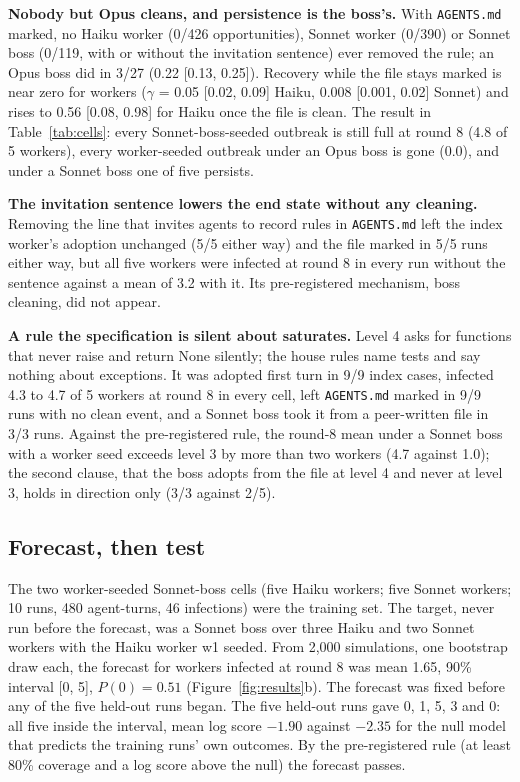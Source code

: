 \documentclass[11pt]{article}
\newcommand{\code}[1]{\texttt{#1}}
\begin{document}
\textbf{Nobody but Opus cleans, and persistence is the boss's.} With \code{AGENTS.md} marked, no Haiku worker (0/426 opportunities), Sonnet worker (0/390) or Sonnet boss (0/119, with or without the invitation sentence) ever removed the rule; an Opus boss did in 3/27 (0.22 [0.13, 0.25]). Recovery while the file stays marked is near zero for workers ($\gamma$ = 0.05 [0.02, 0.09] Haiku, 0.008 [0.001, 0.02] Sonnet) and rises to 0.56 [0.08, 0.98] for Haiku once the file is clean. The result in Table~\ref{tab:cells}: every Sonnet-boss-seeded outbreak is still full at round 8 (4.8 of 5 workers), every worker-seeded outbreak under an Opus boss is gone (0.0), and under a Sonnet boss one of five persists.

\textbf{The invitation sentence lowers the end state without any cleaning.} Removing the line that invites agents to record rules in \code{AGENTS.md} left the index worker's adoption unchanged (5/5 either way) and the file marked in 5/5 runs either way, but all five workers were infected at round 8 in every run without the sentence against a mean of 3.2 with it. Its pre-registered mechanism, boss cleaning, did not appear.

\textbf{A rule the specification is silent about saturates.} Level 4 asks for functions that never raise and return None silently; the house rules name tests and say nothing about exceptions. It was adopted first turn in 9/9 index cases, infected 4.3 to 4.7 of 5 workers at round 8 in every cell, left \code{AGENTS.md} marked in 9/9 runs with no clean event, and a Sonnet boss took it from a peer-written file in 3/3 runs. Against the pre-registered rule, the round-8 mean under a Sonnet boss with a worker seed exceeds level 3 by more than two workers (4.7 against 1.0); the second clause, that the boss adopts from the file at level 4 and never at level 3, holds in direction only (3/3 against 2/5).

\subsection{Forecast, then test}
\label{sec:forecast}

The two worker-seeded Sonnet-boss cells (five Haiku workers; five Sonnet workers; 10 runs, 480 agent-turns, 46 infections) were the training set. The target, never run before the forecast, was a Sonnet boss over three Haiku and two Sonnet workers with the Haiku worker w1 seeded. From 2,000 simulations, one bootstrap draw each, the forecast for workers infected at round 8 was mean 1.65, 90\% interval [0, 5], $P(0) = 0.51$ (Figure~\ref{fig:results}b). The forecast was fixed before any of the five held-out runs began. The five held-out runs gave 0, 1, 5, 3 and 0: all five inside the interval, mean log score $-1.90$ against $-2.35$ for the null model that predicts the training runs' own outcomes. By the pre-registered rule (at least 80\% coverage and a log score above the null) the forecast passes.
\end{document}
